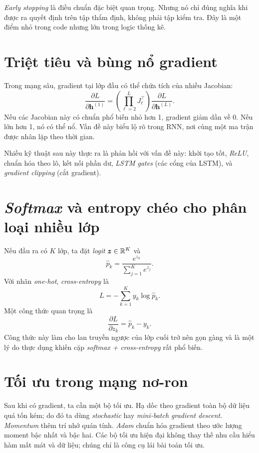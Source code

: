 \emph{Early stopping} là điều chuẩn đặc biệt quan trọng. Nhưng nó chỉ đúng nghĩa khi được ra quyết định trên tập thẩm định, không phải tập kiểm tra. Đây là một điểm nhỏ trong code nhưng lớn trong logic thống kê.

\section{Triệt tiêu và bùng nổ gradient}

Trong mạng sâu, gradient tại lớp đầu có thể chứa tích của nhiều Jacobian:
\[
\frac{\partial L}{\partial \bm{h}^{(1)}}
=
\left(\prod_{\ell=2}^{L} J_\ell^\top\right)
\frac{\partial L}{\partial \bm{h}^{(L)}}.
\]
Nếu các Jacobian này có chuẩn phổ biến nhỏ hơn 1, gradient giảm dần về 0. Nếu lớn hơn 1, nó có thể nổ. Vấn đề này biểu lộ rõ trong RNN, nơi cùng một ma trận được nhân lặp theo thời gian.

Nhiều kỹ thuật sau này thực ra là phản hồi với vấn đề này: khởi tạo tốt, \emph{ReLU}, chuẩn hóa theo lô, kết nối phần dư, \emph{LSTM gates} (các cổng của LSTM), và \emph{gradient clipping} (cắt gradient).

\section{\emph{Softmax} và entropy chéo cho phân loại nhiều lớp}

Nếu đầu ra có \(K\) lớp, ta đặt \emph{logit} \(\bm{z}\in\mathbb{R}^K\) và
\[
\hat{p}_k = \frac{e^{z_k}}{\sum_{j=1}^K e^{z_j}}.
\]
Với nhãn \emph{one-hot}, \emph{cross-entropy} là
\[
L = -\sum_{k=1}^K y_k \log \hat{p}_k.
\]
Một công thức quan trọng là
\[
\frac{\partial L}{\partial z_k} = \hat{p}_k-y_k.
\]
Công thức này làm cho lan truyền ngược của lớp cuối trở nên gọn gàng và là một lý do thực dụng khiến cặp \emph{softmax + cross-entropy} rất phổ biến.

\section{Tối ưu trong mạng nơ-ron}

Sau khi có gradient, ta cần một bộ tối ưu. Hạ dốc theo gradient toàn bộ dữ liệu quá tốn kém; do đó ta dùng \emph{stochastic} hay \emph{mini-batch gradient descent}. \emph{Momentum} thêm trí nhớ quán tính. \emph{Adam} chuẩn hóa gradient theo ước lượng moment bậc nhất và bậc hai. Các bộ tối ưu hiện đại không thay thế nhu cầu hiểu hàm mất mát và dữ liệu; chúng chỉ là công cụ lái bài toán tối ưu.

